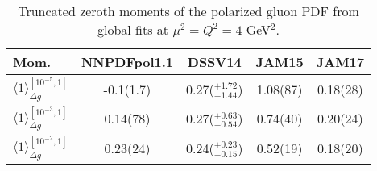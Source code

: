 \begin{table}[!t]
\centering
\footnotesize
\begin{tabular}{lcccc}
\toprule
Mom. & NNPDFpol1.1 & DSSV14 & JAM15 & JAM17\\
\midrule
$\langle 1\rangle_{\Delta g}^{[10^{-5},1]}$  
& -0.1(1.7) & 0.27($^{+1.72}_{-1.44}$)  & 1.08(87) & 0.18(28)\\
$\langle 1\rangle_{\Delta g}^{[10^{-3},1]}$  
& 0.14(78)  & 0.27($^{+0.63}_{-0.54}$)  & 0.74(40) & 0.20(24)\\
$\langle 1\rangle_{\Delta g}^{[10^{-2},1]}$  
& 0.23(24)  & 0.24($^{+0.23}_{-0.15}$)  & 0.52(19) & 0.18(20)\\
\bottomrule
\end{tabular}
\caption{\small Truncated zeroth moments of the polarized gluon PDF from 
global fits at $\mu^2=Q^2=4$ GeV$^2$.}
\label{tab:polgmom}
\end{table}
